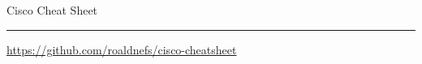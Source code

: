 \documentclass[10pt,landscape]{article}
\begin{document}
\raggedright
\footnotesize
\begin{multicols}{3}


\setlength{\premulticols}{1pt}
\setlength{\postmulticols}{1pt}
\setlength{\multicolsep}{1pt}
\setlength{\columnsep}{2pt}

\begin{center}
     \Large{Cisco Cheat Sheet} \\
\end{center}






























\rule{0.3\linewidth}{0.25pt}
\scriptsize

\href{https://github.com/roaldnefs/cisco-cheatsheet}{https://github.com/roaldnefs/cisco-cheatsheet}


\end{multicols}
\end{document}

